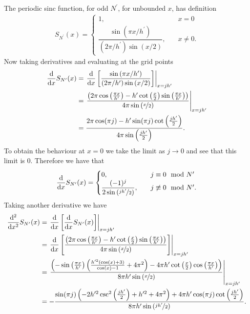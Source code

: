 \documentclass[12pt]{article}
\begin{document}
The periodic sinc function, for odd $N^{\prime}$, for unbounded $x$, has definition
\begin{align}
    S_{N^{\prime}}(x) =
    \begin{cases}
        1,&\quad x = 0 \\
        \dfrac{\sin\left(\pi x/h^{\prime}\right)}{\left(2\pi/h^{\prime}\right)\sin\left(x/2\right)},&\quad x\neq 0.
    \end{cases}
\end{align}
Now taking derivatives and evaluating at the grid points
\begin{subequations}
    \begin{align}
        \dv{}{x}S_{N^{\prime}}(x) &= \left.\dv{}{x}\left[\dfrac{\sin\left(\pi x/h^{\prime}\right)}{\left(2\pi/h^{\prime}\right)\sin\left(x/2\right)}\right]\right|_{x=jh^{\prime}}\\
        &= \left.\frac{\left(2\pi\cos\left(\frac{\pi x}{h^{\prime}}\right)-h^{\prime}\cot\left(\frac{x}{2}\right)\sin\left(\frac{\pi x}{h^{\prime}}\right)\right)}{4 \pi \sin\left(\nicefrac{x}{2}\right)}\right|_{x=jh^{\prime}}\\
        &= \frac{2\pi \cos(\pi j)-h^{\prime}\sin(\pi j)\cot\left(\frac{jh^{\prime}}{2}\right)}{4\pi\sin\left(\frac{jh^{\prime}}{2}\right)}.
    \end{align}
\end{subequations}
To obtain the behaviour at $x = 0$ we take the limit as $j\to 0$ and see that this limit is 0. Therefore we have that
\begin{align}
    \dv{}{x}S_{N^{\prime}}(x) =
    \begin{cases}
        0,&\quad j \equiv 0 \mod N^{\prime}\\
        \dfrac{(-1)^{j}}{2\sin\left(\nicefrac{jh^{\prime}}{2}\right)},&\quad j\not\equiv 0 \mod N^{\prime}.
    \end{cases}
\end{align}
Taking another derivative we have
\begin{subequations}
    \begin{align}
        \dv[2]{}{x}S_{N^{\prime}}(x) &= \left.\dv{}{x}\left[\dv{}{x}S_{N^{\prime}}(x)\right]\right|_{x=jh^{\prime}}\\
        &= \left.\dv{}{x}\left[\frac{\left(2\pi\cos\left(\frac{\pi x}{h^{\prime}}\right)-h^{\prime}\cot\left(\frac{x}{2}\right)\sin\left(\frac{\pi x}{h^{\prime}}\right)\right)}{4 \pi \sin\left(\nicefrac{x}{2}\right)}\right]\right|_{x=jh^{\prime}}\\
        &= \left.\dfrac{\left(-\sin \left(\frac{\pi  x}{h^{\prime}}\right) \left(\frac{h^{\prime 2} (\cos (x)+3)}{\cos (x)-1}+4 \pi ^2\right)-4
            \pi  h^{\prime} \cot \left(\frac{x}{2}\right) \cos \left(\frac{\pi  x}{h^{\prime}}\right)\right)}{8 \pi  h^{\prime}\sin\left(\nicefrac{x}{2}\right) }\right|_{x=jh^{\prime}}\\
        &= -\dfrac{\sin(\pi j) \left(-2 h^{\prime 2} \csc ^2\left(\frac{jh^{\prime}}{2}\right)+h^{\prime 2}+4 \pi ^2\right)+4 \pi  h^{\prime}\cos
            (\pi j) \cot\left(\frac{jh^{\prime}}{2}\right)}{8 \pi h^{\prime}\sin\left(\nicefrac{jh^{\prime}}{2}\right) }.
    \end{align}
\end{subequations}
\end{document}
